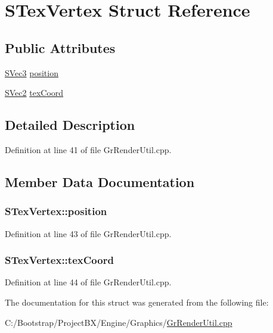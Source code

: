 \hypertarget{struct_s_tex_vertex}{
\section{STexVertex Struct Reference}
\label{struct_s_tex_vertex}
}
\subsection*{Public Attributes}
\begin{CompactItemize}
\item 
\hyperlink{struct_s_vec3}{SVec3} \hyperlink{struct_s_tex_vertex_e05123a67cdc80271ee1d3cab5557247}{position}
\item 
\hyperlink{struct_s_vec2}{SVec2} \hyperlink{struct_s_tex_vertex_c58bd23872cf7f4bfeba4f948688d453}{texCoord}
\end{CompactItemize}


\subsection{Detailed Description}


Definition at line 41 of file GrRenderUtil.cpp.

\subsection{Member Data Documentation}
\hypertarget{struct_s_tex_vertex_e05123a67cdc80271ee1d3cab5557247}{
\subsubsection[{position}]{ {\bf STexVertex::position}}}
\label{struct_s_tex_vertex_e05123a67cdc80271ee1d3cab5557247}




Definition at line 43 of file GrRenderUtil.cpp.\hypertarget{struct_s_tex_vertex_c58bd23872cf7f4bfeba4f948688d453}{
\subsubsection[{texCoord}]{ {\bf STexVertex::texCoord}}}
\label{struct_s_tex_vertex_c58bd23872cf7f4bfeba4f948688d453}




Definition at line 44 of file GrRenderUtil.cpp.

The documentation for this struct was generated from the following file:\begin{CompactItemize}
\item 
C:/Bootstrap/ProjectBX/Engine/Graphics/\hyperlink{_gr_render_util_8cpp}{GrRenderUtil.cpp}\end{CompactItemize}
